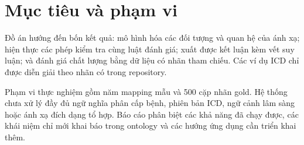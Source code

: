 \section{Mục tiêu và phạm vi}
Đồ án hướng đến bốn kết quả: mô hình hóa các đối tượng và quan hệ của ánh xạ;
hiện thực các phép kiểm tra cùng luật đánh giá; xuất được kết luận kèm vết
suy luận; và đánh giá chất lượng bằng dữ liệu có nhãn tham chiếu.
Các ví dụ ICD chỉ được diễn giải theo nhãn có trong repository.

Phạm vi thực nghiệm gồm năm mapping mẫu và 500 cặp nhãn gold.
Hệ thống chưa xử lý đầy đủ ngữ nghĩa phân cấp bệnh, phiên bản ICD,
ngữ cảnh lâm sàng hoặc ánh xạ đích dạng tổ hợp. Báo cáo phân biệt các
khả năng đã chạy được, các khái niệm chỉ mới khai báo trong ontology
và các hướng ứng dụng cần triển khai thêm.
